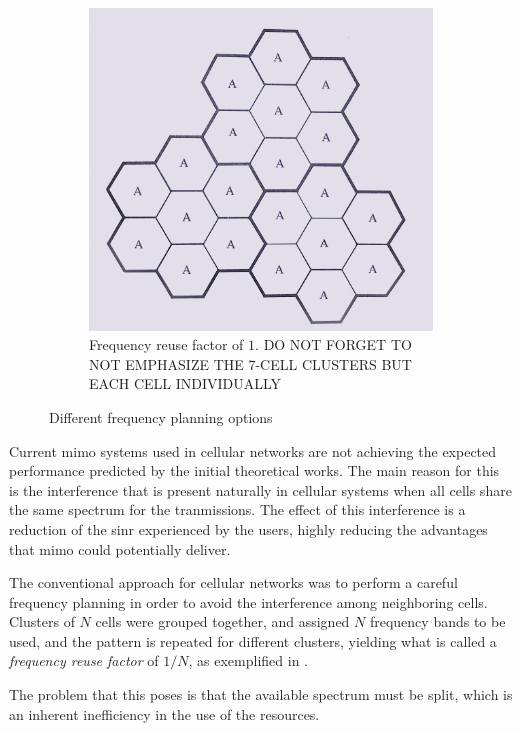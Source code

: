 \begin{figure}[t]
\begin{subfigure}[b]{0.45\textwidth}
        \includegraphics[width=\textwidth]{./01.introduction/img/universal_freq_reuse.png}
        \caption{Frequency reuse factor of $1$. {\color{red} DO NOT FORGET TO NOT EMPHASIZE THE 7-CELL CLUSTERS BUT EACH CELL INDIVIDUALLY}}
        \label{fig:ufreuse}
    \end{subfigure}
    \caption{Different frequency planning options}
    \label{fig:freq_plan}
\end{figure}

Current \gls{mimo} systems used in cellular networks are not achieving the
expected performance predicted by the initial theoretical works. The main reason
for this is the interference that is present naturally in cellular systems when
all cells share the same spectrum for the tranmissions. The effect of this
interference is a reduction of the \gls{sinr} experienced by the users, highly
reducing the advantages that \gls{mimo} could potentially deliver.

The conventional approach for cellular networks was to perform a careful
frequency planning in order to avoid the interference among neighboring cells.
Clusters of $N$ cells were grouped together, and assigned $N$ frequency bands to
be used, and the pattern is repeated for different clusters, yielding what is
called a \emph{frequency reuse factor} of $1/N$, as exemplified in
.

The problem that this poses is that the available spectrum must be split, which
is an inherent inefficiency in the use of the resources.

